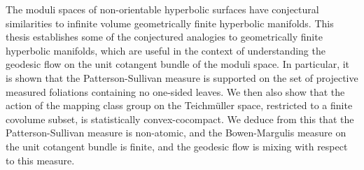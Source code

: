 The moduli spaces of non-orientable hyperbolic surfaces have conjectural similarities to infinite volume geometrically finite hyperbolic manifolds.
This thesis establishes some of the conjectured analogies to geometrically finite hyperbolic manifolds, which are useful in the context of understanding the geodesic flow on the unit cotangent bundle of the moduli space.
In particular, it is shown that the Patterson-Sullivan measure is supported on the set of projective measured foliations containing no one-sided leaves.
We then also show that the action of the mapping class group on the Teichmüller space, restricted to a finite covolume subset, is statistically convex-cocompact.
We deduce from this that the Patterson-Sullivan measure is non-atomic, and the Bowen-Margulis measure on the unit cotangent bundle is finite, and the geodesic flow is mixing with respect to this measure.

